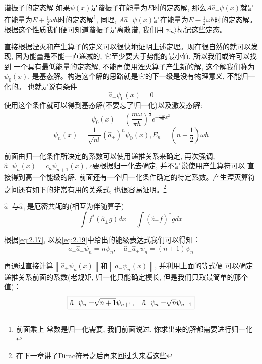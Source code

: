 \documentclass[a4paper,zihao=-4,linespread=1]{ctexrep}
\newenvironment{lequation}{\large\begin{equation}}{\end{equation}}
\begin{document}
    \begin{theorem}{谐振子的定态解}
        如果$\psi(x)$是谐振子在能量为$E$时的定态解, 那么$A\hat{a}_+\psi(x)$就是在能量为$E+\frac{1}{2}\omega\hbar$时的定态解\footnote{前面乘上
        常数是归一化需要, 我们前面说过, 你求出来的解都需要进行归一化}, 同理, $A\hat{a}_-\psi(x)$是在能量为$E-\frac{1}{2}\omega\hbar$时的定态解。
        根据这个性质我们便可知道谐振子是离散谱, 我们用$\ket{\psi_n}$标记这些定态。
    \end{theorem}
    直接根据湮灭和产生算子的定义可以很快地证明上述定理。现在很自然的就可以发现, 因为能量是不能一直递减的, 它至少要大于势能的最小值, 所以我们或许可以找到
    一个具有最低能量的定态解, 不能再使用湮灭算子产生新的解, 这个解我们称为$\psi_0(x)$, 是基态解。构造这个解的思路就是它的下一级是没有物理意义, 不能归一化的。
    也就是说有条件$$\hat{a}_-\psi_0(x)=0$$使用这个条件就可以得到基态解(不要忘了归一化)以及激发态解:
    \begin{lequation}
        \boxed{
            \psi_0(x)=\left(\frac{m\omega}{\pi\hbar}\right)^{\frac{1}{4}}e^{-\frac{m \omega}{2\hbar}x^2}
        }
    \end{lequation}
    \begin{lequation}
        \label{eq:2.19}
        \boxed{
            \psi_n(x)=\frac{1}{\sqrt{n!}}\left(\hat{a}_+\right)^n\psi_0(x),E_n=\left(n+\frac{1}{2}\right)\omega \hbar
        }
    \end{lequation}

    前面由归一化条件所决定的系数可以使用递推关系来确定, 再次强调, $\hat{a}_+\psi_n(x)=c_n\psi_{n+1}(x)$, $c$要根据归一化去确定, 并不是说使用产生算符可以
    直接得到高一个能级的解, 前面还有一个归一化条件确定的待定系数。产生湮灭算符之间还有如下的非常有用的关系式, 也很容易证明。\footnote{在下一章讲了Dirac符号之后再来回过头来看这些}
    \begin{theorem}{$\hat{a}_-$与$\hat{a}_+$是厄密共轭的(相互为伴随算子)}
        \begin{lequation}
            \int f^*(\hat{a}_\pm g)dx=\int (\hat{a}_\mp f)^* gdx
        \end{lequation}
    \end{theorem}
    
    根据\ref{eq:2.17}, 以及\ref{eq:2.19}中给出的能级表达式我们可以得知：
    \[\hat{a}_+\hat{a}_-\psi_n=n\psi_n,\quad\hat{a}_-\hat{a}_+\psi_n=(n+1)\psi_n\]
    
    再通过直接计算$\left \| \hat{a}_+\psi_n(x) \right \|$和$\left \| \hat{a}_-\psi_n(x) \right \|$, 并利用上面的等式便
    可以确定递推关系前面的系数(老规矩, 归一化只能确定模长, 但是我们只取最简单的那个值)：
    \begin{lequation}
        \boxed{
            \label{eq:2.21}
            \hat{a}_+\psi_n=\sqrt[]{n+1}\psi_{n+1},\quad\hat{a}_-\psi_n=\sqrt[]{n}\psi_{n-1}
        }
    \end{lequation}
\end{document}
